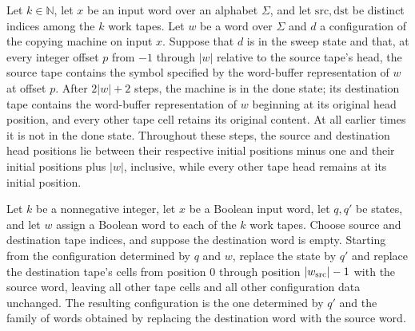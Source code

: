 \begin{theorem}
\label{Turing.copyTM_run_ofCfg}
\leanok
{}
Let $k\in\mathbb{N}$, let $x$ be an input word over an alphabet $\Sigma$, and let
$\mathrm{src},\mathrm{dst}$ be distinct indices among the $k$ work tapes. Let $w$ be a
word over $\Sigma$ and $d$ a configuration of the copying machine on input $x$. Suppose
that $d$ is in the sweep state and that, at every integer offset $p$ from $-1$ through
$|w|$ relative to the source tape's head, the source tape contains the symbol specified
by the word-buffer representation of $w$ at offset $p$. After $2|w|+2$ steps, the
machine is in the done state; its destination tape contains the word-buffer
representation of $w$ beginning at its original head position, and every other tape cell
retains its original content. At all earlier times it is not in the done state.
Throughout these steps, the source and destination head positions lie between their
respective initial positions minus one and their initial positions plus $|w|$,
inclusive, while every other tape head remains at its initial position.
\end{theorem}

\begin{theorem}
\label{Turing.Cfg.ofWords_copy_endpoint}
\leanok
{}
Let $k$ be a nonnegative integer, let $x$ be a Boolean input word, let $q,q'$ be states,
and let $w$ assign a Boolean word to each of the $k$ work tapes. Choose source and
destination tape indices, and suppose the destination word is empty. Starting from the
configuration determined by $q$ and $w$, replace the state by $q'$ and replace the
destination tape's cells from position $0$ through position $|w_{\rm src}|-1$ with the
source word, leaving all other tape cells and all other configuration data unchanged.
The resulting configuration is the one determined by $q'$ and the family of words
obtained by replacing the destination word with the source word.
\end{theorem}

